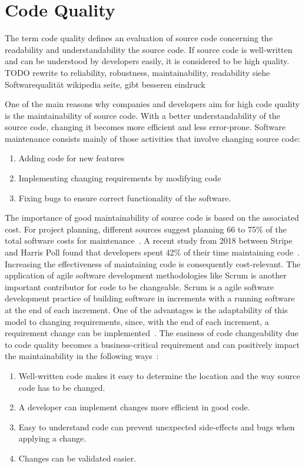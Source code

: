 \section{Code Quality}\label{sec:code_quality}
The term code quality defines an evaluation of source code concerning the readability and understandability the source code. If source code is well-written and can be understood by developers easily, it is considered to be high quality. TODO rewrite to reliability, robustness, maintainability, readability siehe Softwarequalität wikipedia seite, gibt besseren eindruck

One of the main reasons why companies and developers aim for high code quality is the maintainability of source code. With a better understandability of the source code, changing it becomes more efficient and less error-prone.
Software maintenance consists mainly of those activities that involve changing source code:
\begin{enumerate}
    \item Adding code for new features
    \item Implementing changing requirements by modifying code
    \item Fixing bugs to ensure correct functionality of the software.
\end{enumerate}
The importance of good maintainability of source code is based on the associated cost.
For project planning, different sources suggest planning 66 to 75\% of the total software costs for maintenance~\cite{yip_software_1994, galorath_accurately_2019}. A recent study from 2018 between Stripe and Harris Poll found that developers spent 42\% of their time maintaining code~\cite{stripe_developer_2018}. Increasing the effectiveness of maintaining code is consequently cost-relevant.
The application of agile software development methodologies like Scrum is another important contributor for code to be changeable. Scrum is a agile software development practice of building software in increments with a running software at the end of each increment. One of the advantages is the adaptability of this model to changing requirements, since, with the end of each increment, a requirement change can be implemented~\cite{schwaber_agile_2002}.
The easiness of code changeability due to code quality becomes a business-critical requirement and can positively impact the maintainability in the following ways~\cite{baggen_standardized_2012}:
\begin{enumerate}
    \item Well-written code makes it easy to determine the location and the way source code has to be changed.
    \item A developer can implement changes more efficient in good code.
    \item Easy to understand code can prevent unexpected side-effects and bugs when applying a change.
    \item Changes can be validated easier. 
\end{enumerate}

